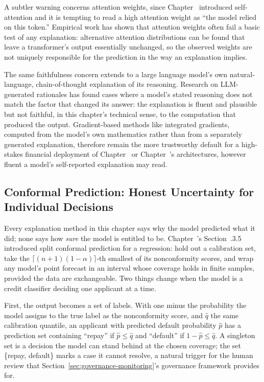 \documentclass[../ai_in_finance]{subfiles}
\begin{document}
A subtler warning concerns attention weights, since Chapter~ introduced self-attention and it is tempting to read a high attention weight as ``the model relied on this token.'' Empirical work \parencite{jain2019attention} has shown that attention weights often fail a basic test of any explanation: alternative attention distributions can be found that leave a transformer's output essentially unchanged, so the observed weights are not uniquely responsible for the prediction in the way an explanation implies.

The same faithfulness concern extends to a large language model's own natural-language, chain-of-thought explanation of its reasoning. Research on LLM-generated rationales \parencite{turpin2023language} has found cases where a model's stated reasoning does not match the factor that changed its answer: the explanation is fluent and plausible but not faithful, in this chapter's technical sense, to the computation that produced the output. Gradient-based methods like integrated gradients, computed from the model's own mathematics rather than from a separately generated explanation, therefore remain the more trustworthy default for a high-stakes financial deployment of Chapter~ or Chapter~'s architectures, however fluent a model's self-reported explanation may read.

\subsection{Conformal Prediction: Honest Uncertainty for Individual Decisions}
\label{sec:conformal-prediction}

Every explanation method in this chapter says why the model predicted what it did; none says how \emph{sure} the model is entitled to be. Chapter~'s Section~.3.5 introduced split conformal prediction for a regression: hold out a calibration set, take the $\lceil (n+1)(1-\alpha) \rceil$-th smallest of its nonconformity scores, and wrap any model's point forecast in an interval whose coverage holds in finite samples, provided the data are exchangeable. Two things change when the model is a credit classifier deciding one applicant at a time.

First, the output becomes a set of labels. With one minus the probability the model assigns to the true label as the nonconformity score, and $\hat q$ the same calibration quantile, an applicant with predicted default probability $\hat p$ has a prediction set containing ``repay'' if $\hat p \le \hat q$ and ``default'' if $1 - \hat p \le \hat q$. A singleton set is a decision the model can stand behind at the chosen coverage; the set \{repay, default\} marks a case it cannot resolve, a natural trigger for the human review that Section~\ref{sec:governance-monitoring}'s governance framework provides for.
\end{document}
